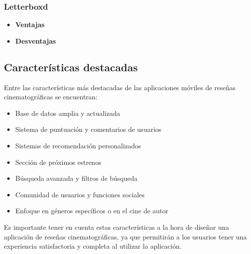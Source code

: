 \subsubsection{Letterboxd}

\begin{itemize}
    \item \textbf{Ventajas}
    \item \textbf{Desventajas}
\end{itemize}



\subsection{Características destacadas}

Entre las características más destacadas de las aplicaciones móviles de reseñas cinematográficas se encuentran:

\begin{itemize}
\item Base de datos amplia y actualizada
\item Sistema de puntuación y comentarios de usuarios
\item Sistemas de recomendación personalizados
\item Sección de próximos estrenos
\item Búsqueda avanzada y filtros de búsqueda
\item Comunidad de usuarios y funciones sociales
\item Enfoque en géneros específicos o en el cine de autor
\end{itemize}

Es importante tener en cuenta estas características a la hora de diseñar una aplicación de reseñas cinematográficas, ya que permitirán a los usuarios tener una experiencia satisfactoria y completa al utilizar la aplicación.
